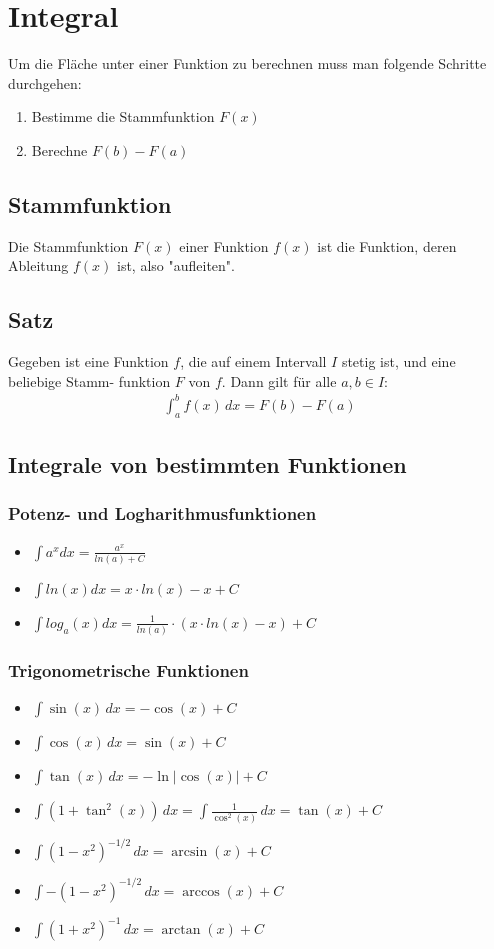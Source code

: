 \section{Integral}
Um die Fläche unter einer Funktion zu berechnen muss man folgende Schritte durchgehen:
\begin{enumerate}
    \item Bestimme die Stammfunktion $F(x)$
    \item Berechne $F(b) - F(a)$
\end{enumerate}
\subsection{Stammfunktion}
Die Stammfunktion $F(x)$ einer Funktion $f(x)$ ist die Funktion, deren Ableitung $f(x)$ ist, also "aufleiten".
\subsection{Satz}
Gegeben ist eine Funktion $f$, die auf einem Intervall $I$ stetig ist, und eine beliebige Stamm-
funktion $F$ von $f$. Dann gilt für alle $a, b \in I$:
\begin{align*}
    \int_a^b f(x)\,dx = F(b) - F(a)
\end{align*}
\subsection{Integrale von bestimmten Funktionen}
\subsubsection{Potenz- und Logharithmusfunktionen}
\begin{itemize}
    \item $\int a^x dx = \frac{a^x}{ln(a) + C}$
    \item $\int ln(x) dx = x \cdot ln(x) - x + C$
    \item $\int log_a(x) dx = \frac{1}{ln(a)} \cdot (x \cdot ln(x) -x) + C$
\end{itemize}
\subsubsection{Trigonometrische Funktionen}
\begin{itemize}
    \item $\int \sin(x) \, dx = -\cos(x) + C$
    \item $\int \cos(x) \, dx = \sin(x) + C$
    \item $\int \tan(x) \, dx = -\ln|\cos(x)| + C$
    \item $\int (1 + \tan^2(x)) \, dx = \int \frac{1}{\cos^2(x)} \, dx = \tan(x) + C$
    \item $\int (1 - x^2)^{-1/2} \, dx = \arcsin(x) + C$
    \item $\int -(1 - x^2)^{-1/2} \, dx = \arccos(x) + C$
    \item $\int (1 + x^2)^{-1} \, dx = \arctan(x) + C$
\end{itemize}